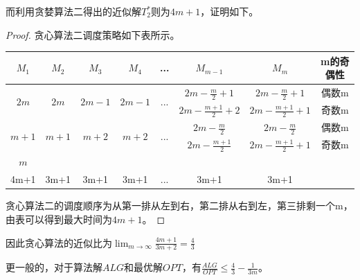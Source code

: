 而利用贪婪算法二得出的近似解$T_2^*$则为$4m+1$，证明如下。
\begin{proof}
	贪心算法二调度策略如下表所示。
	\begin{table}[]
	\begin{tabular}{cccccccc}
	\hline
	$M_1$                  & $M_2$                  & $M_3$                   & $M_4$                   & ...                                       & $M_{m-1}$            & $M_m$                & m的奇偶性 \\ \hline
	\multirow{2}{*}{$2m$}  & \multirow{2}{*}{$2m$}  & \multirow{2}{*}{$2m-1$} & \multirow{2}{*}{$2m-1$} & \multicolumn{1}{c|}{\multirow{2}{*}{...}} & $2m-\frac{m}{2}+1$   & $2m-\frac{m}{2}+1$   & 偶数m   \\ \cline{6-8} 
						   &                        &                         &                         & \multicolumn{1}{c|}{}                     & $2m-\frac{m+1}{2}+2$ & $2m-\frac{m+1}{2}+1$ & 奇数m   \\ \hline
	\multirow{2}{*}{$m+1$} & \multirow{2}{*}{$m+1$} & \multirow{2}{*}{$m+2$}  & \multirow{2}{*}{$m+2$}  & \multicolumn{1}{c|}{\multirow{2}{*}{...}} & $2m-\frac{m}{2}$     & $2m-\frac{m}{2}$     & 偶数m   \\ \cline{6-8} 
						   &                        &                         &                         & \multicolumn{1}{c|}{}                     & $2m-\frac{m+1}{2}$   & $2m-\frac{m+1}{2}+1$ & 奇数m   \\ \hline
	$m$                    &                        &                         &                         &                                           &                      &                      &       \\ \hline
	4m+1                   & 3m+1                   & 3m+1                    & 3m+1                    & ...                                       & 3m+1                 & 3m+1                 &      
	\end{tabular}
	\end{table}
	
	贪心算法二的调度顺序为从第一排从左到右，第二排从右到左，第三排剩一个m，由表可以得到最大时间为$4m+1$。
\end{proof}

因此贪心算法的近似比为$\lim_{m\to \infty}\frac{4m+1}{3m+2}=\frac{4}{3}$

更一般的，对于算法解$ALG$和最优解$OPT$，有$\frac{ALG}{OPT} \leq \frac{4}{3}-\frac{1}{3m}$。



